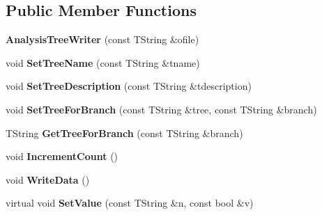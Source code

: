 \subsection*{Public Member Functions}
\begin{DoxyCompactItemize}
\item 
\hypertarget{class_h_a_l_1_1_analysis_tree_writer_a84bd5498078ffc6e67d5265b907705d5}{{\bfseries Analysis\-Tree\-Writer} (const T\-String \&ofile)}\label{class_h_a_l_1_1_analysis_tree_writer_a84bd5498078ffc6e67d5265b907705d5}

\item 
\hypertarget{class_h_a_l_1_1_analysis_tree_writer_a54d51c4078ebaeedd2ce02ac73945a78}{void {\bfseries Set\-Tree\-Name} (const T\-String \&tname)}\label{class_h_a_l_1_1_analysis_tree_writer_a54d51c4078ebaeedd2ce02ac73945a78}

\item 
\hypertarget{class_h_a_l_1_1_analysis_tree_writer_aec457c9a3f813a0ed455e1e4933ddb7f}{void {\bfseries Set\-Tree\-Description} (const T\-String \&tdescription)}\label{class_h_a_l_1_1_analysis_tree_writer_aec457c9a3f813a0ed455e1e4933ddb7f}

\item 
\hypertarget{class_h_a_l_1_1_analysis_tree_writer_a7e27d118b04eeba4c7fe66185c07434b}{void {\bfseries Set\-Tree\-For\-Branch} (const T\-String \&tree, const T\-String \&branch)}\label{class_h_a_l_1_1_analysis_tree_writer_a7e27d118b04eeba4c7fe66185c07434b}

\item 
\hypertarget{class_h_a_l_1_1_analysis_tree_writer_a91582d11e58a4b8d84d4ff35123a3ad3}{T\-String {\bfseries Get\-Tree\-For\-Branch} (const T\-String \&branch)}\label{class_h_a_l_1_1_analysis_tree_writer_a91582d11e58a4b8d84d4ff35123a3ad3}

\item 
\hypertarget{class_h_a_l_1_1_analysis_tree_writer_a2bc77354335ee48351205af7804356fc}{void {\bfseries Increment\-Count} ()}\label{class_h_a_l_1_1_analysis_tree_writer_a2bc77354335ee48351205af7804356fc}

\item 
\hypertarget{class_h_a_l_1_1_analysis_tree_writer_af49d85d3524d21a7da1a27d0a029239d}{void {\bfseries Write\-Data} ()}\label{class_h_a_l_1_1_analysis_tree_writer_af49d85d3524d21a7da1a27d0a029239d}

\item 
\hypertarget{class_h_a_l_1_1_analysis_tree_writer_af8dfdc6182004a8931d9c0f8926ae330}{virtual void {\bfseries Set\-Value} (const T\-String \&n, const bool \&v)}\label{class_h_a_l_1_1_analysis_tree_writer_af8dfdc6182004a8931d9c0f8926ae330}


\end{DoxyCompactItemize}
